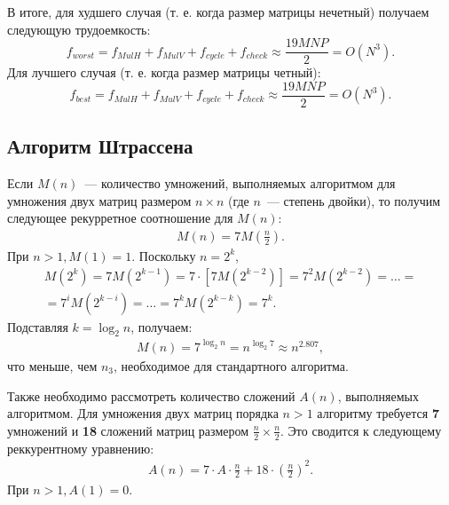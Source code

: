 В итоге, для худшего случая (т. е. когда размер матрицы нечетный) получаем следующую трудоемкость:
\begin{equation}
	f_{worst} = f_{MulH} + f_{MulV} + f_{cycle} + f_{check} \approx \frac{19MNP}{2} = O(N^3).
\end{equation}
Для лучшего случая (т. е. когда размер матрицы четный):
\begin{equation}
	f_{best} = f_{MulH} + f_{MulV} + f_{cycle} + f_{check} \approx \frac{19MNP}{2} = O(N^3).
\end{equation}

\subsection*{Алгоритм Штрассена}
Если $M(n)$~--- количество умножений, выполняемых алгоритмом для умножения двух матриц размером $n \times n$ (где $n$~--- степень двойки), то получим следующее рекурретное соотношение для $M(n)$:
\begin{equation}
	\begin{gathered}
		M(n) = 7M(\frac{n}{2}).
	\end{gathered}
\end{equation}
При $n > 1, M(1) = 1$. Поскольку $n = 2^{k}$,
\begin{equation}
	\begin{gathered}
		M(2^{k}) = 7M(2^{k - 1}) = 7 \cdot [7M(2^{k - 2})] = 7^{2}M(2^{k - 2}) = \dots = \\ = 7^{i}M(2^{k - i}) = \dots = 7^{k}M(2^{k - k}) = 7^{k}.
	\end{gathered}
\end{equation}
Подставляя $k = \log_{2}n$, получаем:
\begin{equation}
	\begin{gathered}
		M(n) = 7^{\log_{2}n} = n^{\log_{2}7} \approx n^{2.807},
	\end{gathered}
\end{equation}
что меньше, чем $n_{3}$, необходимое для стандартного алгоритма.

Также необходимо рассмотреть количество сложений $A(n)$, выполняемых алгоритмом.
Для умножения двух матриц порядка $n > 1$ алгоритму требуется \textbf{7} умножений и \textbf{18} сложений матриц размером $\frac{n}{2} \times \frac{n}{2}$.
Это сводится к следующему реккурентному уравнению:
\begin{equation}
	\begin{gathered}
		A(n) = 7 \cdot A \cdot \frac{n}{2} + 18 \cdot (\frac{n}{2})^{2}.
	\end{gathered}
\end{equation}
При $ n > 1, A(1) = 0$.

